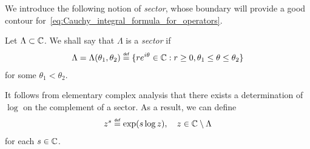 We introduce the following notion of \emph{sector},
whose boundary will provide a good contour for~\eqref{eq:Cauchy_integral_formula_for_operators}.

\begin{definition}[Sector]
    Let $\Lambda \subset \mathbb{C}$.
    We shall say that $\Lambda$ is a \emph{sector} if
    \begin{align*}
        \Lambda
        = \Lambda(\theta_1, \theta_2)
        \defeq \{r \e^{\i \theta} \in \C : r \geq 0, \theta_1 \leq \theta \leq \theta_2\}
    \end{align*}
    for some $\theta_1 < \theta_2$.
\end{definition}

It follows from elementary complex analysis that there exists a determination of $\log$ on the complement of a sector.
As a result,
we can define
\begin{align*}
    z^s \defeq \exp (s \log z),
    \quad z \in \C \setminus \Lambda
\end{align*}
for each $s \in \mathbb{C}$.

